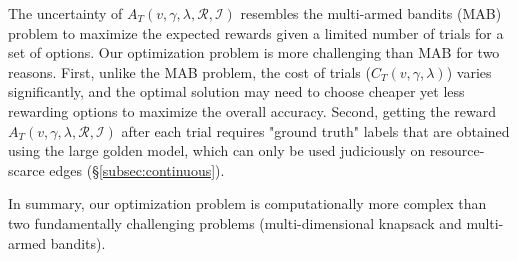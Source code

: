 The uncertainty of $A_T(v, \gamma, \lambda, \mathcal{R}, \mathcal{I})$ resembles the multi-armed bandits (MAB) problem \cite{robbins1952some} to maximize the expected rewards given a limited number of trials for a set of options.
Our optimization problem is more challenging than MAB for two reasons.
First, unlike the MAB problem, the cost of trials ($C_T(v, \gamma, \lambda)$) varies significantly, and the optimal solution may need to choose cheaper yet less rewarding options to maximize the overall accuracy.
Second, getting the reward $A_T(v, \gamma, \lambda, \mathcal{R}, \mathcal{I})$ after each trial %
requires "ground truth" labels that are obtained using the large golden model, which can only be used judiciously on resource-scarce edges (\S\ref{subsec:continuous}).


In summary, our optimization problem is computationally more complex than two fundamentally challenging problems (multi-dimensional knapsack and multi-armed bandits).  

